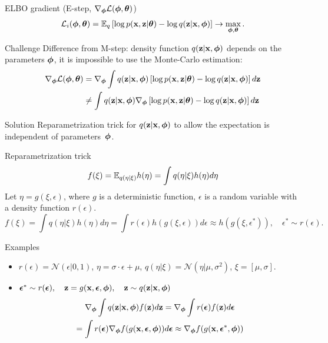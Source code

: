 \begin{frame}{ELBO gradient (E-step, $\nabla_{\boldsymbol{\phi}} \mathcal{L}(\boldsymbol{\phi}, \boldsymbol{\theta})$)}
	\vspace{-0.3cm}
	\[
		 \mathcal{L}_i (\boldsymbol{\phi}, \boldsymbol{\theta})  = \mathbb{E}_{q} \left[\log p(\mathbf{x}, \mathbf{z} | \boldsymbol{\theta}) - \log q(\mathbf{z}| \mathbf{x}, \boldsymbol{\phi}) \right] \rightarrow \max_{\boldsymbol{\phi}, \boldsymbol{\theta}}.
	\]	
	\vspace{-0.3cm}
	\begin{block}{Challenge}
	Difference from M-step: density function $q(\mathbf{z}| \mathbf{x}, \boldsymbol{\phi})$ depends on the parameters $\boldsymbol{\phi}$, it is impossible to use the Monte-Carlo estimation:
	\begin{align*}
		\nabla_{\boldsymbol{\phi}} \mathcal{L} (\boldsymbol{\phi}, \boldsymbol{\theta}) &= \nabla_{\boldsymbol{\phi}} \int q(\mathbf{z} | \mathbf{x}, \boldsymbol{\phi}) \left[\log p(\mathbf{x}, \mathbf{z} | \boldsymbol{\theta}) - \log q(\mathbf{z}| \mathbf{x}, \boldsymbol{\phi}) \right] d \mathbf{z} \\
		& \neq  \int q(\mathbf{z} | \mathbf{x}, \boldsymbol{\phi}) \nabla_{\boldsymbol{\phi}} \left[\log p(\mathbf{x}, \mathbf{z} | \boldsymbol{\theta}) - \log q(\mathbf{z}| \mathbf{x}, \boldsymbol{\phi}) \right] d \mathbf{z} \\
	\end{align*}
	\end{block}
	\vspace{-0.8cm}
	\begin{block}{Solution}
		Reparametrization trick for $q(\mathbf{z} | \mathbf{x}, \boldsymbol{\phi})$ to allow the expectation is independent of parameters~$\boldsymbol{\phi}$.
	\end{block}
\end{frame}
\begin{frame}{Reparametrization trick}
		\vspace{-0.3cm}
		\[
		f(\xi) = \mathbb{E}_{q(\eta | \xi)} h(\eta) = \int q(\eta|\xi) h(\eta) d\eta
		\]
		Let $\eta = g(\xi, \epsilon)$, where $g$ is a deterministic function, $\epsilon$ is a random variable with a density function $r(\epsilon)$.
		{\small
		\[
			f(\xi) = \int q(\eta|\xi) h(\eta) d\eta = \int r(\epsilon) h(g(\xi, \epsilon)) d \epsilon \approx h(g(\xi, \epsilon^*)), \quad \epsilon^* \sim r(\epsilon).
		\]}
	\begin{block}{Examples} 
		\begin{itemize}
		\item $r(\epsilon) = \mathcal{N}(\epsilon|0, 1)$, $\eta = \sigma \cdot \epsilon + \mu$, $q(\eta|\xi) = \mathcal{N}(\eta| \mu, \sigma^2)$, $\xi = [\mu, \sigma]$.

		\item $\boldsymbol{\epsilon}^* \sim r(\boldsymbol{\epsilon}), \quad \mathbf{z} = g(\mathbf{x}, \boldsymbol{\epsilon}, \boldsymbol{\phi}), \quad \mathbf{z} \sim q(\mathbf{z} | \mathbf{x}, \boldsymbol{\phi})$
		\begin{multline*}
			\nabla_{\boldsymbol{\phi}}\int q(\mathbf{z}|\mathbf{x}, \boldsymbol{\phi}) f(\mathbf{z}) d\mathbf{z} = \nabla_{\boldsymbol{\phi}}\int r(\boldsymbol{\epsilon})  f(\mathbf{z}) d\boldsymbol{\epsilon} \\ = \int r(\boldsymbol{\epsilon}) \nabla_{\boldsymbol{\phi}} f(g(\mathbf{x}, \boldsymbol{\epsilon}, \boldsymbol{\phi})) d\boldsymbol{\epsilon} \approx \nabla_{\boldsymbol{\phi}} f(g(\mathbf{x}, \boldsymbol{\epsilon}^*, \boldsymbol{\phi}))
		\end{multline*}
		\end{itemize}
	\end{block}
\end{frame}

